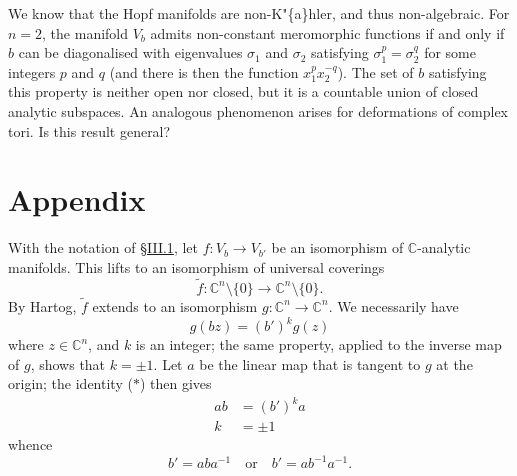 \documentclass[british]{article}
\begin{document}
We know that the Hopf manifolds are non-K"\{a\}hler, and thus
non-algebraic. For \(n=2\), the manifold \(V_b\) admits non-constant
meromorphic functions if and only if \(b\) can be diagonalised with
eigenvalues \(\sigma_1\) and \(\sigma_2\) satisfying
\(\sigma_1^p=\sigma_2^q\) for some integers \(p\) and \(q\) (and there
is then the function \(x_1^px_2^{-q}\)). The set of \(b\) satisfying
this property is neither open nor closed, but it is a countable union of
closed analytic subspaces. An analogous phenomenon arises for
deformations of complex tori. Is this result general?

\section*{Appendix}\label{three-appendix}

With the notation of \hyperref[three-section-III.1]{§III.1}, let
\(f\colon V_b\to V_{b'}\) be an isomorphism of \(\mathbb{C}\)-analytic
manifolds. This lifts to an isomorphism of universal coverings \[
  \widetilde{f}\colon \mathbb{C}^n\setminus\{0\} \to \mathbb{C}^n\setminus\{0\}.
\] By Hartog, \(\widetilde{f}\) extends to an isomorphism
\(g\colon\mathbb{C}^n\to\mathbb{C}^n\). We necessarily have \[
  g(bz) = (b')^kg(z)
\tag{$*$}
\] where \(z\in\mathbb{C}^n\), and \(k\) is an integer; the same
property, applied to the inverse map of \(g\), shows that \(k=\pm1\).
Let \(a\) be the linear map that is tangent to \(g\) at the origin; the
identity (\(*\)) then gives \[
  \begin{aligned}
    ab &= (b')^ka
  \\k &= \pm1
  \end{aligned}
\] whence \[
  b' = aba^{-1}
  \quad\text{or}\quad
  b'= ab^{-1}a^{-1}.
\]


\nocite{*}
\printbibliography[heading=bibintoc,title=Bibliography]
\end{document}

